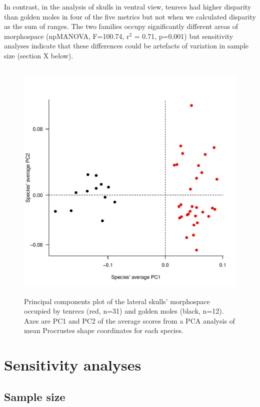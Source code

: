 \documentclass[12pt,a4paper]{article}
\begin{document}
In contrast, in the analysis of skulls in ventral view, tenrecs had higher disparity than golden moles in four of the five metrics but not when we calculated disparity as the sum of ranges.
The two families occupy significantly different areas of morphospace (npMANOVA, F=100.74, r$^{2}$ = 0.71, p=0.001) but sensitivity analyses indicate that these differences could be artefacts of variation in sample size (section X below).


\begin{figure}[H]
\centering
\includegraphics[width=12cm, height=12cm, keepaspectratio=true]
{figures/skvent_tenrec+gmole_PCA.jpg}
\caption{Principal components plot of the lateral skulls' morphospace occupied by tenrecs (red, n=31) and golden moles (black, n=12). Axes are PC1 and PC2 of the average scores from a PCA analysis of mean Procrustes shape coordinates for each species. }
\label{fig:skventPCA}
\end{figure}


\section{Sensitivity analyses}
\subsection{Sample size}
\end{document}

